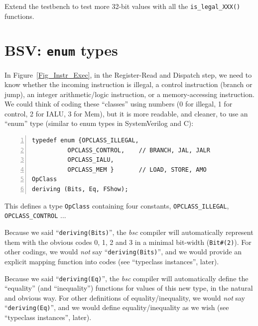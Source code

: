 \Exercise

Extend the testbench to test more 32-bit values with all the
\verb|is_legal_XXX()| functions.

\Endexercise


\section{BSV: {\tt enum} types}

\label{BSV_enum_types}


In Figure~\ref{Fig_Instr_Exec}, in the Register-Read
and Dispatch step, we need to know whether the incoming instruction is
illegal, a control instruction (branch or jump), an integer
arithmetic/logic instruction, or a memory-accessing instruction.  We
could think of coding these ``classes'' using numbers (0 for illegal,
1 for control, 2 for IALU, 3 for Mem), but it is more readable, and
cleaner, to use an ``enum'' type (similar to enum types in
SystemVerilog and C):

\begin{Verbatim}[frame=single, numbers=left]
typedef enum {OPCLASS_ILLEGAL,
	      OPCLASS_CONTROL,    // BRANCH, JAL, JALR
	      OPCLASS_IALU,
	      OPCLASS_MEM }       // LOAD, STORE, AMO
OpClass
deriving (Bits, Eq, FShow);
\end{Verbatim}

This defines a type \verb|OpClass| containing four constants,
\verb|OPCLASS_ILLEGAL|, \verb|OPCLASS_CONTROL| ...


Because we said ``\verb|deriving(Bits)|'', the \emph{bsc} compiler
will automatically represent them with the obvious codes 0, 1, 2 and 3
in a minimal bit-width (\verb|Bit#(2)|).  For other codings, we would
\emph{not} say ``\verb|deriving(Bits)|'', and we would provide an
explicit mapping function into codes (see ``typeclass instances'',
later).


Because we said ``\verb|deriving(Eq)|'', the \emph{bsc} compiler will
automatically define the ``equality'' (and ``inequality'') functions
for values of this new type, in the natural and obvious way.  For
other definitions of equality/inequality, we would \emph{not} say
``\verb|deriving(Eq)|'', and we would define equality/inequality as we
wish (see ``typeclass instances'', later).

